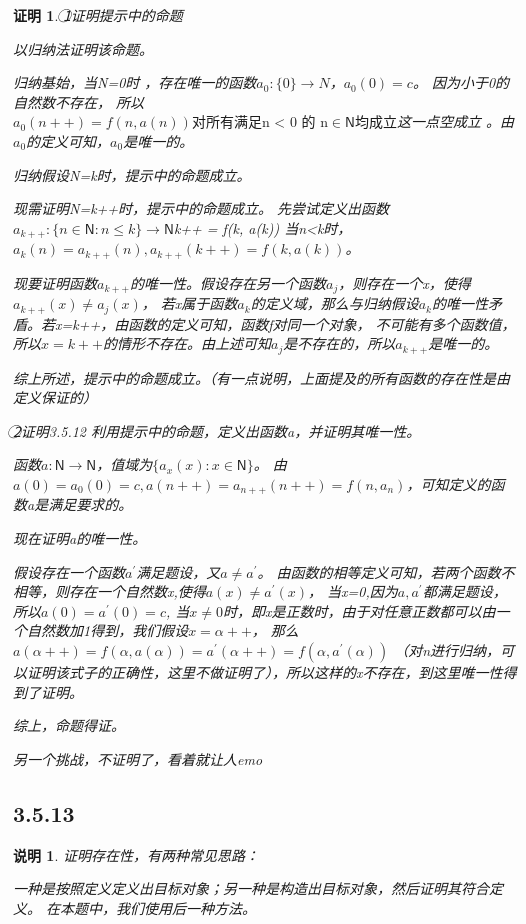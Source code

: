 \documentclass{article}
\theoremstyle{mystyle}
\newtheorem*{zremark}{说明}
\theoremstyle{zproofstyle}
\newtheorem*{zproof}{证明}
\begin{document}
\begin{zproof}
  \textcircled{1}证明提示中的命题

  以归纳法证明该命题。

  归纳基始，当N=0时 ，存在唯一的函数$a_0: \{0\} \rightarrow N$，$a_0(0)=c$。
  因为小于0的自然数不存在，
  所以$a_0(n++) = f(n,a(n)) \text{对所有满足n < 0 的 n} \in \mathsf{N} \text{均成立}$这一点空成立
  。由$a_0$的定义可知，$a_0$是唯一的。

  归纳假设N=k时，提示中的命题成立。

  现需证明N=k++时，提示中的命题成立。
  先尝试定义出函数$a_{k++}: \{n \in \mathsf{N}: n \leq k \} \rightarrow \mathsf{N}$k++ = f(k, a(k))
  当n<k时，$a_k(n) = a_{k++}(n), a_{k++}(k++) = f(k, a(k))$。

  现要证明函数$a_{k++}$的唯一性。假设存在另一个函数$a_j$，则存在一个x，使得$a_{k++}(x) \neq a_j(x)$，
  若x属于函数$a_k$的定义域，那么与归纳假设$a_k$的唯一性矛盾。若x=k++，由函数的定义可知，函数f对同一个对象，
  不可能有多个函数值，所以$x = k++$的情形不存在。由上述可知$a_j$是不存在的，所以$a_{k++}$是唯一的。

  综上所述，提示中的命题成立。（有一点说明，上面提及的所有函数的存在性是由定义保证的）

  \textcircled{2}证明3.5.12
  利用提示中的命题，定义出函数a，并证明其唯一性。

  函数$a: \mathsf{N} \rightarrow \mathsf{N}$，值域为$\{a_x(x): x \in \mathsf{N}\}$。
  由$a(0)=a_0(0)=c, a(n++) = a_{n++}(n++) = f(n, a_{n})$，可知定义的函数a是满足要求的。

  现在证明a的唯一性。

  假设存在一个函数$a^\prime$满足题设，又$a \neq a^\prime$。
  由函数的相等定义可知，若两个函数不相等，则存在一个自然数x,使得$a(x) \neq a^\prime(x)$，
  当x=0,因为$a, a^\prime $都满足题设，所以$a(0)=a^\prime(0)=c$,
  当$x \neq 0$时，即x是正数时，由于对任意正数都可以由一个自然数加1得到，我们假设$x = \alpha ++$，
  那么$a(\alpha ++) = f(\alpha, a(\alpha)) = a^\prime(\alpha ++) = f(\alpha, a^\prime (\alpha))$
  （对n进行归纳，可以证明该式子的正确性，这里不做证明了），所以这样的x不存在，到这里唯一性得到了证明。

  综上，命题得证。


  另一个挑战，不证明了，看着就让人emo

\end{zproof}

\subsection*{3.5.13}
\begin{zgraytheorem}
  \begin{zremark}
    证明存在性，有两种常见思路：

    一种是按照定义定义出目标对象；另一种是构造出目标对象，然后证明其符合定义。
    在本题中，我们使用后一种方法。
  \end{zremark}
\end{zgraytheorem}
\end{document}
